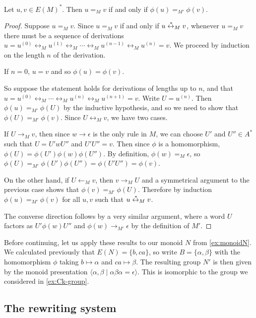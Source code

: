 \documentclass[noindex,noinsetproof,emphthm,12pt]{lmaths}
\newcommand{\leftrightst}{\mathrel{\smash{\stackrel{\hspace{0.1em}\ast}{\leftrightarrow}}}}
\begin{document}
\begin{prop}
	Let $u, v \in E(M)^*$. Then $u =_M v$ if and only if $\phi(u) =_{M'} \phi(v)$. \label{prop:phi-compatible-MM'}
\end{prop}
\begin{proof}
	Suppose $u =_M v$. Since $u =_M v$ if and only if $u \leftrightst_M v$, whenever $u =_M v$ there must be a sequence of derivations $u = u^{(0)} \leftrightarrow_M u^{(1)} \leftrightarrow_M \cdots \leftrightarrow_M u^{(n-1)} \leftrightarrow_M u^{(n)} = v$. We proceed by induction on the length $n$ of the derivation.

	If $n = 0$, $u = v$ and so $\phi(u) = \phi(v)$.
	
	So suppose the statement holds for derivations of lengths up to $n$, and that $u = u^{(0)} \leftrightarrow_M \cdots \leftrightarrow_M u^{(n)} \leftrightarrow_M u^{(n+1)} = v$. Write $U = u^{(n)}$. Then $\phi(u) =_{M'} \phi(U)$ by the inductive hypothesis, and so we need to show that $\phi(U) =_{M'} \phi(v)$. Since $U \leftrightarrow_M v$, we have two cases.

	If $U \to_M v$, then since $w \to \epsilon$ is the only rule in $M$, we can choose $U'$ and $U'' \in A^*$ such that $U = U'wU''$ and $U'U'' = v$. Then since $\phi$ is a homomorphism, $\phi(U) = \phi(U')\phi(w)\phi(U'') $. By definition, $\phi(w) =_M \epsilon$, so $\phi(U) =_{M'} \phi(U')\phi(U'') = \phi(U'U'') = \phi(v)$.

	On the other hand, if $U \leftarrow_M v$, then $v \to_M U$ and a symmetrical argument to the previous case shows that $\phi(v) =_{M'} \phi(U)$. Therefore by induction $\phi(u) =_{M'} \phi(v)$ for all $u, v$ such that $u \leftrightst_M v$.


	The converse direction follows by a very similar argument, where a word $U$ factors as $U'\phi(w)U''$ and $\phi(w) \to_{M'} \epsilon$ by the definition of $M'$.
\end{proof}

Before continuing, let us apply these results to our monoid $N$ from \cref{ex:monoidN}. We calculated previously that $E(N) = \{b, ca\}$, so write $B = \{\alpha, \beta\}$ with the homomorphism $\phi$ taking $b \mapsto \alpha$ and $ca \mapsto \beta$. The resulting group $N'$ is then given by the monoid presentation $\langle \alpha, \beta \mid \alpha\beta\alpha = \epsilon \rangle$. This is isomorphic to the group we considered in \cref{ex:Ck-group}.

\subsection{The rewriting system}
\end{document}
